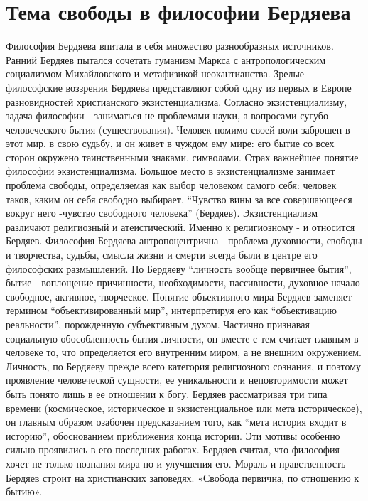 \documentclass[12pt]{article}
\begin{document}
\section{Тема свободы в философии Бердяева}
Философия Бердяева впитала в себя множество разнообразных источников. Ранний Бердяев пытался сочетать
гуманизм Маркса с антропологическим социализмом Михайловского и метафизикой неокантианства. Зрелые
философские воззрения Бердяева представляют собой одну из первых в Европе разновидностей христианского
экзистенциализма.  Согласно  экзистенциализму,  задача  философии  -  заниматься  не  проблемами  науки,  а
вопросами сугубо человеческого бытия (существования). Человек помимо своей воли заброшен в этот мир, в
свою судьбу, и он живет в чуждом ему мире: его бытие со всех сторон окружено таинственными знаками,
символами. Страх важнейшее понятие философии экзистенциализма. 
Большое место в экзистенциализме занимает проблема свободы, определяемая как выбор человеком самого
себя: человек таков, каким он себя свободно выбирает. “Чувство вины за все совершающееся вокруг него -чувство свободного человека” (Бердяев).
Экзистенциализм различают религиозный и атеистический. Именно к религиозному - и относится Бердяев.
Философия Бердяева антропоцентрична - проблема духовности, свободы и творчества, судьбы, смысла жизни и
смерти всегда были в центре его философских размышлений. По Бердяеву “личность вообще первичнее бытия”,
бытие  -  воплощение  причинности,  необходимости,  пассивности,  духовное  начало  свободное,  активное,
творческое. Понятие объективного мира Бердяев заменяет термином “объективированный мир”, интерпретируя
его  как  “объективацию  реальности”,  порожденную  субъективным  духом.  Частично  признавая  социальную
обособленность  бытия  личности,  он  вместе  с  тем  считает  главным  в  человеке  то,  что  определяется  его
внутренним миром, а не внешним окружением. Личность, по Бердяеву прежде всего категория религиозного
сознания,  и  поэтому  проявление  человеческой  сущности,  ее  уникальности  и  неповторимости  может  быть
понято лишь в ее отношении к богу.
Бердяев  рассматривая  три  типа  времени  (космическое,  историческое  и  экзистенциальное  или  мета
историческое),  он  главным  образом  озабочен  предсказанием  того,  как  “мета  история  входит  в  историю”,
обоснованием приближения конца истории. Эти мотивы особенно сильно проявились в его последних работах.
Бердяев считал, что философия хочет не только познания мира но и улучшения его. Мораль и нравственность
Бердяев строит на христианских заповедях.
«Свобода первична, по отношению к бытию». 
\end{document}
